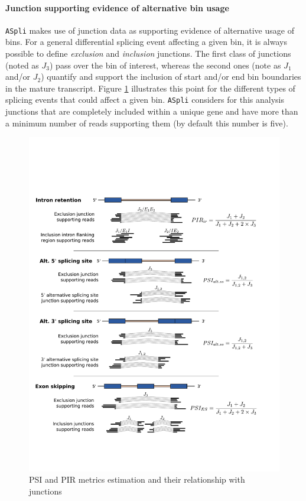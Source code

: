 \documentclass{article}
\begin{document}
\paragraph{Junction supporting evidence of alternative bin usage}
\label{sec:psir}

\texttt{ASpli} makes use of junction data  as supporting evidence of alternative usage of bins. For a general differential splicing event affecting a given bin, it is always possible to define {\em exclusion} and {\em inclusion} junctions. The first class of junctions (noted as $J_3$) pass over the bin of interest, whereas the second ones (note as $J_1$ and/or $J_2$) quantify and support the inclusion of start and/or end bin boundaries in the mature transcript. Figure \ref{fig:pirEq} illustrates this point for the different types of splicing events that could affect a given bin. \texttt{ASpli} considers for this analysis junctions that are completely included within a unique gene and have more than a minimum number of reads supporting them (by default this number is five).\\

\begin{figure}[ht!]
    \centering
      \includegraphics[width=0.9 \textwidth]{images/psi_pir2.pdf}
    \caption{PSI and PIR metrics estimation and their relationship with junctions}
\label{fig:pirEq}
\end{figure}
\end{document}

